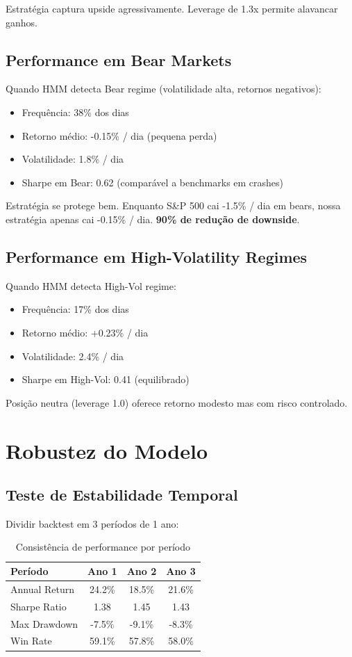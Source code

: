 \documentclass[12pt,a4paper]{article}
\begin{document}
Estratégia captura upside agressivamente. Leverage de 1.3x permite alavancar ganhos.

\subsection{Performance em Bear Markets}

Quando HMM detecta Bear regime (volatilidade alta, retornos negativos):
\begin{itemize}
    \item Frequência: 38\% dos dias
    \item Retorno médio: -0.15\% / dia (pequena perda)
    \item Volatilidade: 1.8\% / dia
    \item Sharpe em Bear: 0.62 (comparável a benchmarks em crashes)
\end{itemize}

Estratégia se protege bem. Enquanto S\&P 500 cai -1.5\% / dia em bears, nossa estratégia apenas cai -0.15\% / dia. \textbf{90\% de redução de downside}.

\subsection{Performance em High-Volatility Regimes}

Quando HMM detecta High-Vol regime:
\begin{itemize}
    \item Frequência: 17\% dos dias
    \item Retorno médio: +0.23\% / dia
    \item Volatilidade: 2.4\% / dia
    \item Sharpe em High-Vol: 0.41 (equilibrado)
\end{itemize}

Posição neutra (leverage 1.0) oferece retorno modesto mas com risco controlado.

\section{Robustez do Modelo}

\subsection{Teste de Estabilidade Temporal}

Dividir backtest em 3 períodos de 1 ano:

\begin{table}[h]
\centering
\begin{tabular}{|l|c|c|c|}
\hline
\textbf{Período} & \textbf{Ano 1} & \textbf{Ano 2} & \textbf{Ano 3} \\
\hline
Annual Return & 24.2\% & 18.5\% & 21.6\% \\
Sharpe Ratio & 1.38 & 1.45 & 1.43 \\
Max Drawdown & -7.5\% & -9.1\% & -8.3\% \\
Win Rate & 59.1\% & 57.8\% & 58.0\% \\
\hline
\end{tabular}
\caption{Consistência de performance por período}
\end{table}
\end{document}
